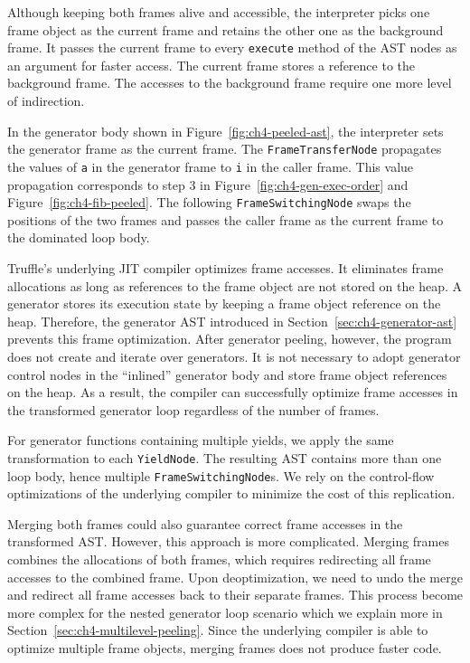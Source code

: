 Although keeping both frames alive and accessible, the interpreter picks one frame object as the current frame and retains the other one as the background frame.
It passes the current frame to every \texttt{execute} method of the AST nodes as an argument for faster access.
The current frame stores a reference to the background frame.
The accesses to the background frame require one more level of indirection.

In the generator body shown in Figure~\ref{fig:ch4-peeled-ast}, the interpreter sets the generator frame as the current frame.
The \texttt{FrameTransferNode} propagates the values of \texttt{a} in the generator frame to \texttt{i} in the caller frame.
This value propagation corresponds to step 3 in Figure~\ref{fig:ch4-gen-exec-order} and Figure~\ref{fig:ch4-fib-peeled}.
The following \texttt{FrameSwitchingNode} swaps the positions of the two frames and passes the caller frame as the current frame to the dominated loop body.

Truffle's underlying JIT compiler optimizes frame accesses.
It eliminates frame allocations as long as references to the frame object are not stored on the heap.
A generator stores its execution state by keeping a frame object reference on the heap.
Therefore, the generator AST introduced in Section~\ref{sec:ch4-generator-ast} prevents this frame optimization.
After generator peeling, however, the program does not create and iterate over generators.
It is not necessary to adopt generator control nodes in the ``inlined'' generator body and store frame object references on the heap.
As a result, the compiler can successfully optimize frame accesses in the transformed generator loop regardless of the number of frames.

For generator functions containing multiple yields, we apply the same transformation to each \texttt{YieldNode}.
The resulting AST contains more than one loop body, hence multiple \texttt{FrameSwitchingNode}s.
We rely on the control-flow optimizations of the underlying compiler to minimize the cost of this replication.

Merging both frames could also guarantee correct frame accesses in the transformed AST.
However, this approach is more complicated.
Merging frames combines the allocations of both frames, which requires redirecting all frame accesses to the combined frame.
Upon deoptimization, we need to undo the merge and redirect all frame accesses back to their separate frames.
This process become more complex for the nested generator loop scenario which we explain more in Section~\ref{sec:ch4-multilevel-peeling}.
Since the underlying compiler is able to optimize multiple frame objects, merging frames does not produce faster code.

